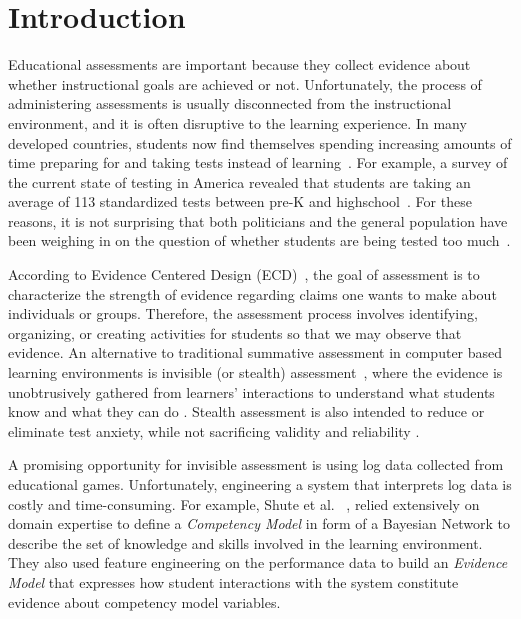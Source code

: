 \documentclass{sigchi}
\begin{document}
{}

\section{Introduction}
Educational assessments are important because they collect evidence about  whether instructional goals are achieved or not.
Unfortunately, the process of  administering assessments is usually disconnected from the instructional environment, and  it is often  disruptive to the learning experience. 
In many developed countries, students now find themselves spending increasing amounts of time preparing for and taking tests instead of learning~\cite{hofman2015re}.
For example, a  survey of the current state of testing in America revealed that students are taking an average of 113 standardized tests between pre-K and highschool~\cite{lazarin2014testing}. 
For these reasons, it is not surprising that both politicians and the general population have been weighing in on the question of whether students are being tested too much~\cite{lazarin2014testing}.


According to Evidence Centered Design (ECD)~\cite{mislevy2012design}, the goal of assessment is to characterize the strength of evidence regarding claims one wants to make about individuals or groups.
Therefore, the assessment process involves identifying, organizing, or creating activities for students so that we may observe that evidence.
An alternative to traditional summative assessment in computer based learning environments is invisible (or stealth) assessment~\cite{shute2013stealth},
where the evidence is unobtrusively gathered from learners' interactions to understand what students know and what they can do \cite{shute2009melding}.
Stealth assessment is also intended to reduce or eliminate test anxiety, while not sacrificing validity and reliability \cite{shute2008you}.

A promising opportunity for invisible assessment is using log data collected from educational games.
Unfortunately, engineering a system that interprets log data is costly and time-consuming.
For example, Shute et al. ~\cite{shute2013stealth, shute2009melding}, relied extensively on domain expertise to define a \textit{Competency Model} in form of a Bayesian Network to describe the set of knowledge and skills involved in the learning environment.
They also used feature engineering on the performance data to build an \textit{Evidence Model} that expresses how student interactions with the system constitute evidence about competency model variables.
\end{document}
